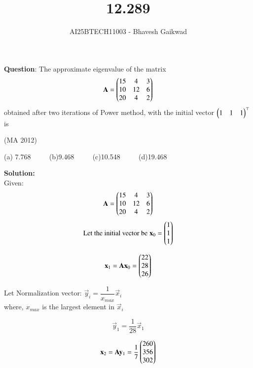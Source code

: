 \documentclass[journal]{IEEEtran}
\begin{document}

\vspace{3cm}

\title{12.289}
\author{AI25BTECH11003 - Bhavesh Gaikwad}
{\let\newpage\relax\maketitle}

\renewcommand{\thefigure}{\theenumi}
\renewcommand{\thetable}{\theenumi}
\setlength{\intextsep}{10pt} 

\renewcommand{\thetable}{\theenumi}


\textbf{Question}: The approximate eigenvalue of the matrix 
$$\mathbf{A} = \begin{pmatrix}15 & 4 & 3 \\ 10 & 12 & 6 \\ 20 & 4 & 2\end{pmatrix}$$
obtained after two iterations of Power method, with the initial vector $\begin{pmatrix}1 & 1 & 1\end{pmatrix}^\top$ is 

\hfill{(MA 2012)}

(a) 7.768 $\qquad$ (b)9.468 $\qquad$ (c)10.548 $\qquad$ (d)19.468
\bigskip
 
\textbf{Solution:}\\
Given: 
$$\mathbf{A} = \begin{pmatrix}15 & 4 & 3 \\ 10 & 12 & 6 \\ 20 & 4 & 2\end{pmatrix}$$
$$\text{Let the initial vector be} \; \mathbf{x}_0 = \begin{pmatrix}1 \\ 1 \\ 1\end{pmatrix}$$

\begin{equation}
\mathbf{x}_{1} = \mathbf{A}\mathbf{x}_0 = \begin{pmatrix}22 \\ 28 \\ 26\end{pmatrix}    
\end{equation}


Let Normalization vector: $\vec{y}_i = \dfrac{1}{x_{max}}\vec{x}_i$\\
where, $x_{max}$ is the largest element in $\vec{x}_i$

\begin{equation}
\vec{y}_1 = \frac{1}{28}\vec{x}_1   
\end{equation}

\begin{equation}
\mathbf{x}_2 = \mathbf{A}\mathbf{y}_1 = \frac{1}{7}\begin{pmatrix}260 \\ 356 \\ 302\end{pmatrix} 
\end{equation}
\end{document}
